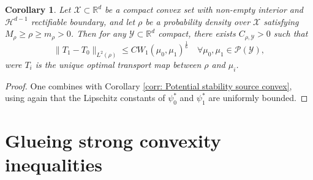 \documentclass[11pt, oneside, titlepage]{book}
\theoremstyle{plain}
\newtheorem{corollary}{Corollary}[theorem]
\theoremstyle{definition}
\newcommand{\R}{\mathbb{R}}
\newcommand{\X}{\mathcal{X}}
\newcommand{\Y}{\mathcal{Y}}
\begin{document}
\begin{corollary} \textnormal{\cite{delalande2023quantitative}}
\label{corr: map stability source convex}
    Let $\X \subset \R^d$ be a compact convex set with non-empty interior and $\mathcal{H}^{d-1}$ rectifiable boundary, and let $\rho$ be a probability density over $\X$ satisfying $M_\rho \geq \rho \geq m_\rho >0$. Then for any $\Y \subset \R^d$ compact, there exists $C_{\rho, \Y} > 0$ such that
    \begin{equation}
        \| T_1 - T_0\|_{L^2(\rho)} \leq C W_1(\mu_0, \mu_1)^{\frac{1}{6}} \quad \forall \mu_0, \mu_1 \in \mathcal{P}(\Y),
    \end{equation}  
    were $T_i$  is the unique optimal transport map between $\rho$ and $\mu_i$.
\end{corollary}
\begin{proof}
    One combines \cite[Proposition 4.1]{delalande2023quantitative} with Corollary \ref{corr: Potential stability source convex}, using again that the Lipschitz constants of $\psi_0^*$ and $\psi_1^*$ are uniformly bounded.
\end{proof}






\section{Glueing strong convexity inequalities}
\end{document}
